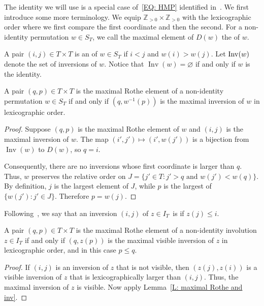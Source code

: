 \documentclass[10pt]{article}
\begin{document}
The identity we will use is a special case 
of~\eqref{EQ: HMP} identified in~\cite{HMPstanley}.
We first introduce some more terminology.
We equip $\mathbb Z_{>0}\times\mathbb Z_{>0}$
with the lexicographic order where we first compare
the first coordinate and then the second.
For a non-identity permutation $w\in S_T$,
we call the maximal element of $D(w)$
the  of $w$.

A pair $(i,j) \in T \times T$ is an
 of $w \in S_T$ if $i<j$ and $w(i)>w(j)$.
Let $\mathrm{Inv}(w)$ denote the set of inversions of $w$.
Notice that $\operatorname{Inv}(w)=\varnothing$
if and only if $w$ is the identity.

\begin{lemma}
\label{L: maximal Rothe and inv}
A pair $(q,p) \in T\times T$ is the maximal Rothe element of a non-identity permutation $w\in S_T$
if and only if $(q,w^{-1}(p))$
is the maximal inversion of $w$
in lexicographic order.
\end{lemma}

\begin{proof}
Suppose $(q,p)$ is the maximal Rothe element of $w$
and $(i,j)$ is the maximal inversion of $w$.
The map $(i',j')\mapsto(i',w(j'))$
is a bijection from $\operatorname{Inv}(w)$ to $D(w)$,
so $q=i$.

Consequently, there are no inversions
whose first coordinate is larger than $q$.
Thus, $w$ preserves the relative order on
$J=\{j' \in T: j'>q\text{ and }w(j')<w(q)\}$.
By definition, $j$ is the largest element of $J$,
while $p$ is the largest of
$\{w(j'):j'\in J\}$.
Therefore $p=w(j)$.
\end{proof}


Following~\cite{HMPstanley},
we say that an inversion $(i,j)$ of $z \in I_T$\
is  if $z(j)\leq i$.

\begin{corollary}
\label{C: maximal Rothe and inv}
A pair $(q,p) \in T\times T$ is the maximal Rothe element of a non-identity involution $z\in I_T$
if and only if $(q,z(p))$
is the maximal visible inversion of $z$
in lexicographic order,
and in this case $p \leq q$.
\end{corollary}
\begin{proof}
If $(i,j)$ is an inversion of $z$ that is not visible,
then $(z(j),z(i))$ is a visible inversion of $z$
that is lexicographically larger than $(i,j)$.
Thus, the maximal inversion of $z$ is visible.
Now apply Lemma~\ref{L: maximal Rothe and inv}.
\end{proof}
\end{document}
